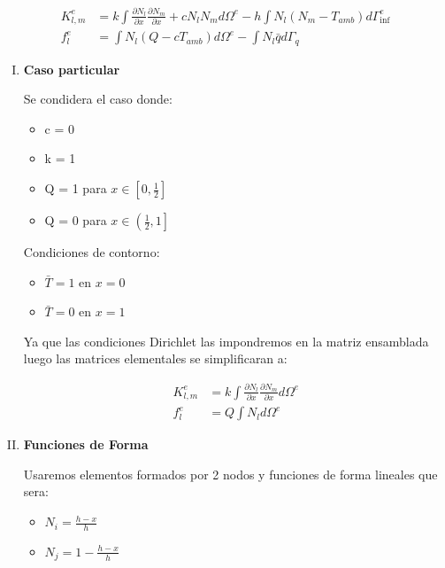 \documentclass{article}
\begin{document}
\begin{enumerate}[1)]
{        \begin{align}
            K_{l,m}^{e} &= k\int{ \frac{\partial N_l}{\partial x} \frac{\partial N_m}{\partial x} + c N_l N_m  d\Omega^{e}} - h \int{ N_l \left(N_m-T_{amb}\right) d\Gamma_{\inf}^{e}}\\
            f_{l}^{e}   &= \int{N_l \left( Q - cT_{amb}\right) d\Omega^{e}} - \int{ N_l \bar{q} d\Gamma_{q}}
        \end{align}

        \begin{enumerate}[I.]
        \item \textbf{Caso particular}

        Se condidera el caso donde:
        \begin{itemize}
            \item c = 0
            \item k = 1
            \item Q = 1 para $x \in \left[0,\frac{1}{2}\right]$
            \item Q = 0 para $x \in \left(\frac{1}{2},1\right]$
        \end{itemize}

        Condiciones de contorno:
        \begin{itemize}
            \item $\bar{T} = 1$ en $x=0$
            \item $\bar{T} = 0$ en $x=1$
        \end{itemize}

        Ya que las condiciones Dirichlet las impondremos en la matriz ensamblada luego las matrices elementales se simplificaran a:

        \begin{align}
            K_{l,m}^{e} &=  k\int{ \frac{\partial N_l}{\partial x} \frac{\partial N_m}{\partial x} d\Omega^{e}}\\
            f_{l}^{e}   &= Q \int{N_l d\Omega^{e}}
        \end{align}

        \item \textbf{Funciones de Forma}

        Usaremos elementos formados por 2 nodos y funciones de forma lineales que sera:

        \begin{itemize}
            \item $N_i = \frac{h-x}{h}$
            \item $N_j = 1-\frac{h-x}{h}$
        \end{itemize}


\end{enumerate}}
\end{enumerate}
\end{document}
